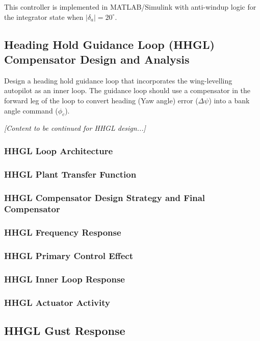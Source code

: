 This controller is implemented in MATLAB/Simulink with anti-windup logic for the integrator state when $|\delta_a| = 20^\circ$.

\subsection{Heading Hold Guidance Loop (HHGL) Compensator Design and Analysis}

Design a heading hold guidance loop that incorporates the wing-levelling autopilot as an inner loop. The guidance loop should use a compensator in the forward leg of the loop to convert heading (Yaw angle) error ($\Delta \psi$) into a bank angle command ($\phi_c$).

\textit{[Content to be continued for HHGL design...]}

\subsubsection{HHGL Loop Architecture}

\subsubsection{HHGL Plant Transfer Function}

\subsubsection{HHGL Compensator Design Strategy and Final Compensator}

\subsubsection{HHGL Frequency Response}

\subsubsection{HHGL Primary Control Effect}

\subsubsection{HHGL Inner Loop Response}

\subsubsection{HHGL Actuator Activity}

\subsection{HHGL Gust Response}

